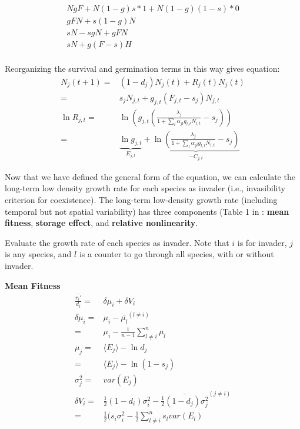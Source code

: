 \documentclass[11pt,a4paper,oneside]{article}
\begin{document}
\begin{align*}
NgF + N(1-g)s*1 + N(1-g)(1-s)*0
\\
gFN + s(1-g)N
\\
sN - sgN + gFN
\\
sN+g(F-s)H
\\
\end{align*}

\noindent Reorganizing the survival and germination terms in this way gives equation:
\begin{align}
N_{j}(t+1) = & (1-d_{j})N_{j}(t) + R_{j}(t)N_{j}(t) \\
= & s_{j}N_{j,t} +g_{j,t}(F_{j,t}-s_{j})N_{j,t}\\
\ln R_{j,t}= & \ln(g_{j,t}(\frac{\lambda_{j}}{1+\sum\limits_{l}\alpha_{jl}g_{l,t}N_{l,t}} -s_{j}))\\
= & \underbrace{\ln g_{j,t}}_\text{$E_{j,t}$} + \underbrace{ \ln(\frac{\lambda_{j}}{1+\sum\limits_{l}\alpha_{jl}g_{l,t}N_{l,t}}-s_{j})}_\text{$-C_{j,t}$}
\end{align}

\noindent  Now that we have defined the general form of the equation, we can calculate the long-term low density growth rate for each species as invader (i.e., invasibility criterion for coexistence).  The long-term low-density growth rate (including temporal but not spatial variability) has three components (Table 1 in \citet{chesson2003}: \textbf{mean fitness}, \textbf{storage effect}, and \textbf{relative nonlinearity}.  


\noindent  Evaluate the growth rate of each species as invader.  Note that $i$ is for invader, $j$ is any species, and $l$ is a counter to go through all species, with or without invader.

\noindent \textbf{Mean Fitness}
\begin{align*}
\frac{\bar{r_{i}\prime}}{d_{i}} = & \delta \mu_{i} + \delta V_{i}\\
\delta \mu_{i} = & \mu_{i}-\bar{\mu_{l}}^{({l}\neq {i})} \\
= & \mu_{i}-\frac{1}{n-1}\sum\limits_{{l}\neq{i}}^{n}\mu_{l}\\
\mu _{j} = & \langle E_{j} \rangle -\ln d_{j}\\
= &\langle {E_{j}} \rangle -\ln (1-{s_j})\\
\sigma_{j}^{2} = & var(E_{j})\\
\delta V_{i} = & \frac{1}{2}(1-d_{i})\sigma_{i}^{2}-\bar{\frac{1}{2}(1-d_{j}) \sigma_{j}^{2}}^{(j \neq i)}\\
= & \frac{1}{2}(s_{i}\sigma_{i}^{2} - \frac{1}{2}\sum\limits_{l \neq i}^{n}s_{l}var(E_{l})
\end{align*}
\end{document}
